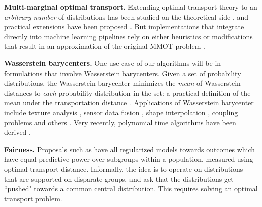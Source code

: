 {\bf Multi-marginal optimal transport.}
Extending optimal transport theory to an {\em arbitrary number} of distributions has been 
studied on the theoretical side \citep{pass2015multi}, and practical extensions have been proposed \citep{mmotcuturi}. But implementations that integrate directly into machine learning pipelines rely on either heuristics or modifications that result in an approximation of the original MMOT problem \citep{cao2019multi}.

{\bf Wasserstein barycenters.}
One use case of our algorithms will be in 
formulations that involve Wasserstein barycenters. 
Given a set of probability distributions, the Wasserstein barycenter minimizes 
the {\em mean} of Wasserstein
distances to {\em each} probability distribution in the set: a practical definition of the mean under the transportation distance  \citep{sinkbaryfw,fastbary,agueh2011barycenters,janati2020debiased}. 
Applications of Wasserstein barycenter  
include texture analysis \citep{rabin2011wasserstein}, sensor data fusion \citep{elvander2020multi}, shape interpolation \citep{solomon2015convolutional}, coupling problems \citep{ruschendorf2002n} and others \citep{ho2017multilevel}. Very recently, polynomial time algorithms have been derived  \citep{altschuler2021wasserstein}. 

{\bf Fairness.}
Proposals such as 
\citep{jiang2020wasserstein,fairregress,gordaliza2019obtaining} have all 
regularized models towards outcomes which have equal predictive power over subgroups within a population, measured using optimal transport distance.  
Informally, the idea is to operate on 
distributions that are supported on disparate groups, and 
ask that the distributions get ``pushed" towards 
a common central distribution. This requires solving an optimal transport problem.

